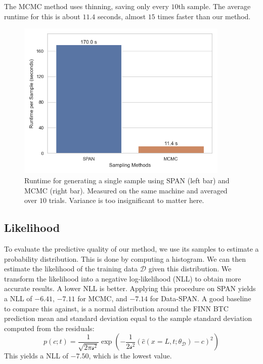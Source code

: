 The MCMC method uses thinning, saving only every $10$th sample. The average runtime for this is about $11.4$ seconds, almost $15$ times faster than our method.



\begin{figure}
    \centering
    \includegraphics[width=0.9\textwidth]{figs/runtime_per_sample.png}
    \caption{Runtime for generating a single sample using SPAN (left bar) and MCMC (right bar). Measured on the same machine and averaged over $10$ trials. Variance is too insignificant to matter here.}
    \label{fig:runtime_per_sample}
\end{figure}

\subsection{Likelihood}
\label{sec:likelihood}
To evaluate the predictive quality of our method, we use its samples to estimate a probability distribution. This is done by computing a histogram. We can then estimate the likelihood of the training data $\mathcal{D}$ given this distribution. We transform the likelihood into a negative log-likelihood (NLL) to obtain more accurate results. A lower NLL is better. Applying this procedure on SPAN yields a NLL of $-6.41$, $-7.11$ for MCMC, and $-7.14$ for Data-SPAN. A good baseline to compare this against, is a normal distribution around the FINN BTC prediction mean and standard deviation equal to the sample standard deviation computed from the residuals:
\begin{equation*}
    p(c; t) = \frac{1}{\sqrt{2 \pi \mathcal{s}^2}} \exp(-\frac{1}{2 \mathcal{s}^2} (\hat{c}(x=L, t; \theta_{\mathcal{D}}) - c)^2)
\end{equation*}
This yields a NLL of $-7.50$, which is the lowest value. %


